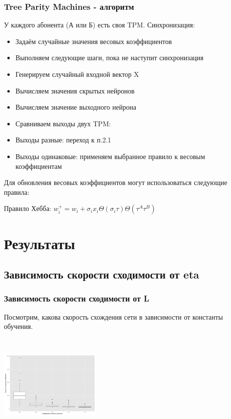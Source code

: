 \documentclass{beamer}
\begin{document}
\begin{frame}
\frametitle{Tree Parity Machines - алгоритм}
У каждого абонента (А или Б) есть своя TPM. 
Синхронизация:
\begin{itemize}

\item Задаём случайные значения весовых коэффициентов
\item Выполняем следующие шаги, пока не наступит синхронизация
\item Генерируем случайный входной вектор X
\item Вычисляем значения скрытых нейронов
\item Вычисляем значение выходного нейрона
\item Сравниваем выходы двух TPM:
\item Выходы разные: переход к п.2.1
\item Выходы одинаковые: применяем выбранное правило к весовым коэффициентам
\end{itemize} 

Для обновления весовых коэффициентов могут использоваться следующие правила:

Правило Хебба:
\(w_i^+=w_i+\sigma_ix_i\Theta(\sigma_i\tau)\Theta(\tau^A\tau^B)\)
\end{frame}

\section{Результаты}
\subsection{Зависимость скорости сходимости от eta}
\begin{frame}
\frametitle{Зависимость скорости сходимости от L}
Посмотрим, какова скорость схождения сети в зависимости от константы обучения.

\begin{center}
\includegraphics[width=5cm, height=5cm]{../../plots/eta_vs_speed.png}

\end{center}
\end{frame}
\end{document}
